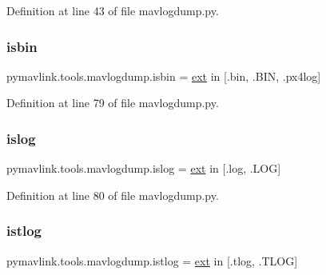 Definition at line 43 of file mavlogdump.\+py.

\mbox{\label{namespacepymavlink_1_1tools_1_1mavlogdump_af56e6708a5dbbf02ca5b3497e4fc6aab}} 
\subsubsection{\texorpdfstring{isbin}{isbin}}
{\footnotesize\ttfamily pymavlink.\+tools.\+mavlogdump.\+isbin = \mbox{\hyperlink{namespacepymavlink_1_1tools_1_1mavlogdump_ad2aee23289790e6ed5482ef50c2c53b0}{ext}} in \mbox{[}\textquotesingle{}.bin\textquotesingle{}, \textquotesingle{}.B\+IN\textquotesingle{}, \textquotesingle{}.px4log\textquotesingle{}\mbox{]}}



Definition at line 79 of file mavlogdump.\+py.

\mbox{\label{namespacepymavlink_1_1tools_1_1mavlogdump_ae6ae5f3d617fddf9083caa61aa248e18}} 
\subsubsection{\texorpdfstring{islog}{islog}}
{\footnotesize\ttfamily pymavlink.\+tools.\+mavlogdump.\+islog = \mbox{\hyperlink{namespacepymavlink_1_1tools_1_1mavlogdump_ad2aee23289790e6ed5482ef50c2c53b0}{ext}} in \mbox{[}\textquotesingle{}.log\textquotesingle{}, \textquotesingle{}.L\+OG\textquotesingle{}\mbox{]}}



Definition at line 80 of file mavlogdump.\+py.

\mbox{\label{namespacepymavlink_1_1tools_1_1mavlogdump_a3ae8fff201f063e8f0036e4cfa1c8d1f}} 
\subsubsection{\texorpdfstring{istlog}{istlog}}
{\footnotesize\ttfamily pymavlink.\+tools.\+mavlogdump.\+istlog = \mbox{\hyperlink{namespacepymavlink_1_1tools_1_1mavlogdump_ad2aee23289790e6ed5482ef50c2c53b0}{ext}} in \mbox{[}\textquotesingle{}.tlog\textquotesingle{}, \textquotesingle{}.T\+L\+OG\textquotesingle{}\mbox{]}}



